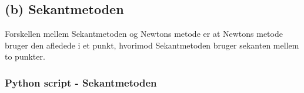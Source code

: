 \subsection*{(b) Sekantmetoden}

Forskellen mellem Sekantmetoden og Newtons metode er at Newtons metode bruger den afledede i et punkt, hvorimod Sekantmetoden bruger sekanten mellem to punkter. 
%
\subsubsection*{Python script - Sekantmetoden}
%
